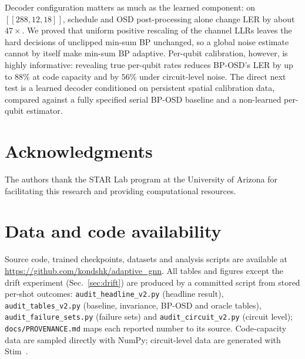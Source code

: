 \documentclass[a4paper,twocolumn,11pt,nopdfoutputerror]{quantumarticle}
\newcommand{\code}[3]{\ensuremath{[\![#1,#2,#3]\!]}}
\begin{document}
Decoder configuration matters as much as the learned component: on
$\code{288}{12}{18}$, schedule and OSD post-processing alone change LER by
about $47\times$. We proved that uniform positive rescaling of the channel
LLRs leaves the hard decisions of unclipped min-sum BP unchanged, so a
global noise estimate cannot by itself make min-sum BP adaptive. Per-qubit
calibration, however, is highly informative: revealing true per-qubit
rates reduces BP-OSD's LER by up to $88\%$ at code capacity and by $56\%$
under circuit-level noise. The direct next test is a learned decoder
conditioned on persistent spatial calibration data, compared against a
fully specified serial BP-OSD baseline and a non-learned per-qubit
estimator.

\section*{Acknowledgments}

The authors thank the STAR Lab program at the University of Arizona
for facilitating this research and providing computational resources.

\section*{Data and code availability}

Source code, trained checkpoints, datasets and analysis scripts are
available at \url{https://github.com/kondshk/adaptive_gnn}.
All tables and figures except the drift experiment (Sec.~\ref{sec:drift})
are produced by a committed script from stored
per-shot outcomes: \texttt{audit\_headline\_v2.py} (headline result),
\texttt{audit\_tables\_v2.py} (baseline, invariance, BP-OSD and oracle
tables), \texttt{audit\_failure\_sets.py} (failure sets) and
\texttt{audit\_circuit\_v2.py} (circuit level); \texttt{docs/PROVENANCE.md}
maps each reported number to its source. Code-capacity data are sampled directly with NumPy;
circuit-level data are generated with Stim~\cite{Gidney2021Stim}.



\end{document}

